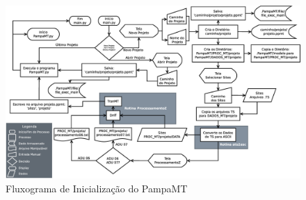             
    \begin{landscape}
    
    \begin{figure}[H]
                \caption{Fluxograma de Inicialização do PampaMT}
                \begin{center}
                    \includegraphics[width=21cm]{texto/fig/mainpy.eps} 
                \end{center}
                \label{fig_influ_mainpy} 
            \end{figure}
    \end{landscape} 
